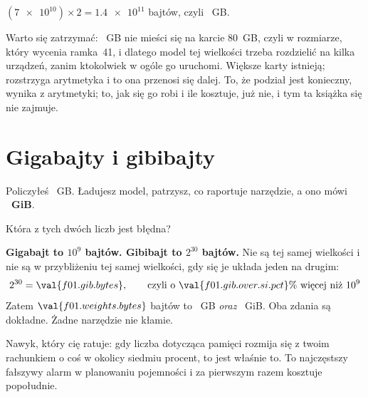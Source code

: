 \begin{fr}
\begin{ansblock}
$(\num{7e10}) \times 2 = \num{1.4e11}$ bajtów, czyli ~GB.
\end{ansblock}

Warto się zatrzymać: ~GB nie mieści się na karcie $80$~GB,
czyli w rozmiarze, który wycenia ramka~41, i dlatego model tej wielkości trzeba
rozdzielić na kilka urządzeń, zanim ktokolwiek w ogóle go uruchomi. Większe
karty istnieją; rozstrzyga arytmetyka i to ona przenosi się dalej. To,
że podział jest konieczny, wynika z arytmetyki; to, jak się go robi i ile
kosztuje, już nie, i tym ta książka się nie zajmuje.
\end{fr}

\section{Gigabajty i gibibajty}
\label{sec:F01-prefixes}

\begin{fr}
Policzyłeś ~GB. Ładujesz model, patrzysz, co raportuje
narzędzie, a ono mówi \textbf{~GiB}.

Która z tych dwóch liczb jest błędna?
\nextframe
\end{fr}

\begin{fr}
\begin{trapbox}
\textbf{Gigabajt to $10^{9}$ bajtów. Gibibajt to $2^{30}$ bajtów.} Nie są tej
samej wielkości i nie są w przybliżeniu tej samej wielkości, gdy się je układa
jeden na drugim:
\[ 2^{30} = \val{f01.gib.bytes}, \qquad
   \text{czyli o } \val{f01.gib.over.si.pct}\% \text{ więcej niż } 10^{9} \]
Zatem $\val{f01.weights.bytes}$ bajtów to ~GB \emph{oraz}
~GiB. Oba zdania są dokładne. Żadne narzędzie nie kłamie.

Nawyk, który cię ratuje: gdy liczba dotycząca pamięci rozmija się z twoim
rachunkiem o coś w okolicy siedmiu procent, to jest właśnie to. To najczęstszy
fałszywy alarm w planowaniu pojemności i za pierwszym razem kosztuje
popołudnie.
\end{trapbox}
\end{fr}

